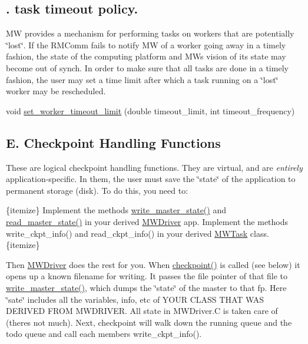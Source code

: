 \subsection*{. task timeout policy.}
\label{_amgrp7940828ce8508c8dd1b9ee869fcde339}%
MW provides a mechanism for performing tasks on workers that are potentially \char`\"{}lost\char`\"{}. If the R\+M\+Comm fails to notify MW of a worker going away in a timely fashion, the state of the computing platform and MW\textquotesingle{}s vision of its state may become out of synch. In order to make sure that all tasks are done in a timely fashion, the user may set a time limit after which a task running on a \char`\"{}lost\char`\"{} worker may be rescheduled. \begin{DoxyCompactItemize}
\item 
void \hyperlink{classMWDriver_ad41f96ba14ccc7712be09c0374eae9c9}{set\+\_\+worker\+\_\+timeout\+\_\+limit} (double timeout\+\_\+limit, int timeout\+\_\+frequency)
\end{DoxyCompactItemize}
\subsection*{E. Checkpoint Handling Functions}
\label{_amgrp591991dcf907ef1843a851b7742dde4d}%
These are logical checkpoint handling functions. They are virtual, and are {\itshape entirely} application-\/specific. In them, the user must save the \char`\"{}state\char`\"{} of the application to permanent storage (disk). To do this, you need to\+:

\{itemize\}  Implement the methods \hyperlink{classMWDriver_ab3a42409894c40f6992f01b433174588}{write\+\_\+master\+\_\+state()} and \hyperlink{classMWDriver_ab575d8dec66c8edadc165ebc6ea4e5a9}{read\+\_\+master\+\_\+state()} in your derived \hyperlink{classMWDriver}{M\+W\+Driver} app.  Implement the methods write\+\_\+ckpt\+\_\+info() and read\+\_\+ckpt\+\_\+info() in your derived \hyperlink{classMWTask}{M\+W\+Task} class. \{itemize\}

Then \hyperlink{classMWDriver}{M\+W\+Driver} does the rest for you. When \hyperlink{classMWDriver_ad41bdc32bc2f56f7816810bc4d260db2}{checkpoint()} is called (see below) it opens up a known filename for writing. It passes the file pointer of that file to \hyperlink{classMWDriver_ab3a42409894c40f6992f01b433174588}{write\+\_\+master\+\_\+state()}, which dumps the \char`\"{}state\char`\"{} of the master to that fp. Here \char`\"{}sate\char`\"{} includes all the variables, info, etc of Y\+O\+UR C\+L\+A\+SS T\+H\+AT W\+AS D\+E\+R\+I\+V\+ED F\+R\+OM M\+W\+D\+R\+I\+V\+ER. All state in M\+W\+Driver.\+C is taken care of (there\textquotesingle{}s not much). Next, checkpoint will walk down the running queue and the todo queue and call each member\textquotesingle{}s write\+\_\+ckpt\+\_\+info().

